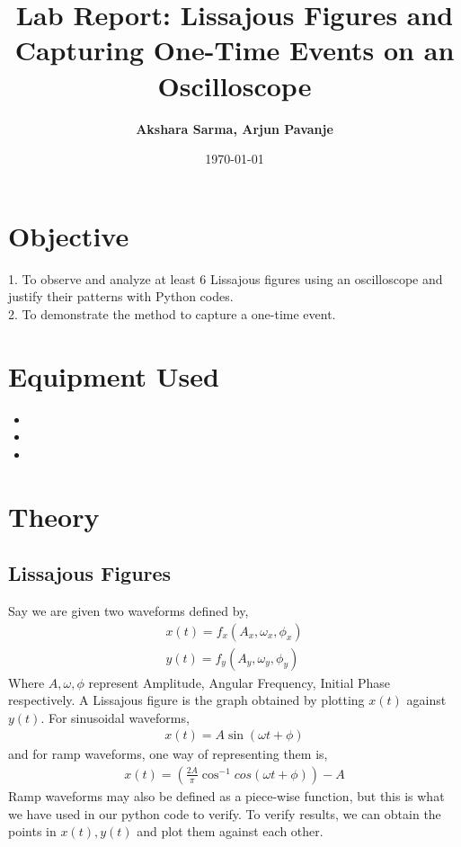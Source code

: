 \documentclass[report]{IEEEtran}
\title{Lab Report: Lissajous Figures and Capturing One-Time Events on an Oscilloscope}
\author{\textbf{Akshara Sarma, Arjun Pavanje}}
\date{\today}
\begin{document}
\maketitle

\section*{Objective}
1. To observe and analyze at least 6 Lissajous figures using an oscilloscope and justify their patterns with Python codes.\\
2. To demonstrate the method to capture a one-time event.\\

\section*{Equipment Used}
\begin{itemize}
\item {}
    \item {}
    \item {}
\end{itemize}
\section*{Theory}
\subsection*{Lissajous Figures}
Say we are given two waveforms defined by,
\begin{align*}
  x(t) = f_x(A_x, \omega _x, \phi _x)\\
  y(t) = f_y(A_y, \omega _y, \phi_y)
\end{align*}
Where $A, \omega, \phi$ represent Amplitude, Angular Frequency, Initial Phase respectively. A Lissajous figure is the graph obtained by plotting $x(t)$ against $y(t)$. \newline
For sinusoidal waveforms, 
\begin{align*}
  x(t) = A \sin (\omega t + \phi)
\end{align*}
and for ramp waveforms, one way of representing them is, 
\begin{align*}
  x(t) = (\frac{2A}{\pi} \cos^{-1}cos(\omega t + \phi)) - A
  \end{align*}
  Ramp waveforms may also be defined as a piece-wise function, but this is what we have used in our python code to verify. To verify results, we can obtain the points in $x(t), y(t)$ and plot them against each other.
\end{document}
